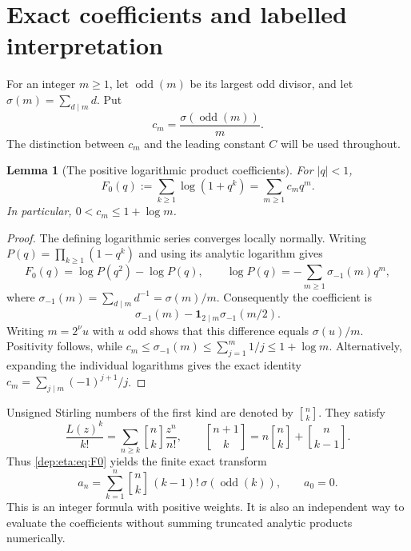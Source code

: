 \documentclass[11pt]{article}
\newtheorem{lemma}[theorem]{Lemma}
\theoremstyle{definition}\newtheorem{definition}[theorem]{Definition}
\theoremstyle{remark}\newtheorem{remark}[theorem]{Remark}
\newcommand{\odd}{\operatorname{odd}}
\newcommand{\stir}[2]{\genfrac{[}{]}{0pt}{}{#1}{#2}}
\begin{document}
\section{Exact coefficients and labelled interpretation}\label{dep:eta:sec:exact}
For an integer $m\ge1$, let $\odd(m)$ be its largest odd divisor,
and let $\sigma(m)=\sum_{d\mid m}d$. Put
\begin{equation}\label{dep:eta:eq:cm}
 c_m=\frac{\sigma(\odd(m))}{m}.
\end{equation}
The distinction between $c_m$ and the leading constant $C$ will be used
throughout.

\begin{lemma}[The positive logarithmic product coefficients]\label{dep:eta:lem:cm}
For $|q|<1$,
\begin{equation}\label{dep:eta:eq:F0}
 F_0(q):=\sum_{k\ge1}\log(1+q^k)=\sum_{m\ge1}c_mq^m.
\end{equation}
In particular, $0<c_m\le1+\log m$.
\end{lemma}
\begin{proof}
The defining logarithmic series converges locally normally. Writing
$P(q)=\prod_{k\ge1}(1-q^k)$ and using its analytic logarithm gives
\[
 F_0(q)=\log P(q^2)-\log P(q),\qquad
 \log P(q)=-\sum_{m\ge1}\sigma_{-1}(m)q^m,
\]
where $\sigma_{-1}(m)=\sum_{d\mid m}d^{-1}=\sigma(m)/m$.
Consequently the coefficient is
\[
 \sigma_{-1}(m)-\mathbf1_{2\mid m}\sigma_{-1}(m/2).
\]
Writing $m=2^\nu u$ with $u$ odd shows that this difference equals
$\sigma(u)/m$. Positivity follows, while
$c_m\le\sigma_{-1}(m)\le\sum_{j=1}^m1/j\le1+\log m$.
Alternatively, expanding the individual logarithms gives the exact
identity $c_m=\sum_{j\mid m}(-1)^{j+1}/j$.
\end{proof}

Unsigned Stirling numbers of the first kind are denoted by
$\stir nk$. They satisfy
\[
 \frac{L(z)^k}{k!}=\sum_{n\ge k}\stir nk\frac{z^n}{n!},
 \qquad
 \stir{n+1}k=n\stir nk+\stir n{k-1}.
\]
Thus \eqref{dep:eta:eq:F0} yields the finite exact transform
\begin{equation}\label{dep:eta:eq:stirling}
 a_n=\sum_{k=1}^n\stir nk\,(k-1)!\,\sigma(\odd(k)),\qquad a_0=0.
\end{equation}
This is an integer formula with positive weights. It is also an
independent way to evaluate the coefficients without summing truncated
analytic products numerically.
\end{document}
